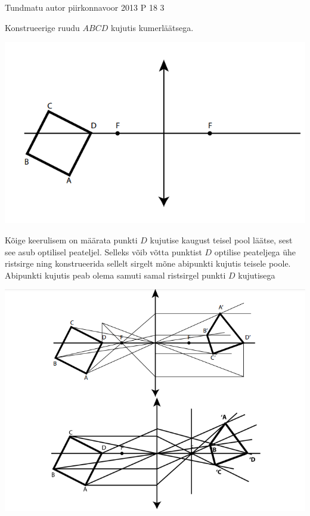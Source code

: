 {Tundmatu autor} %
{piirkonnavoor} %
{2013} %
{P 18} %
{3} %
{
\ifStatement
Konstrueerige ruudu $ABCD$ kujutis kumerläätsega.
\begin{center}
	\includegraphics[width=0.5\linewidth]{2013-v2p-18-yl.PNG}
\end{center}
\fi
\ifHint
Kõige keerulisem on määrata punkti $D$ kujutise kaugust teisel pool läätse, sest see asub optilisel peateljel. Selleks võib võtta punktist $D$ optilise peateljega ühe ristsirge ning konstrueerida sellelt sirgelt mõne abipunkti kujutis teisele poole. Abipunkti kujutis peab olema samuti samal ristsirgel punkti $D$ kujutisega
\fi
\ifSolution
\begin{center}
	\includegraphics[width=0.5\linewidth]{2013-v2p-18-lah.PNG}
\end{center}
\fi
}
